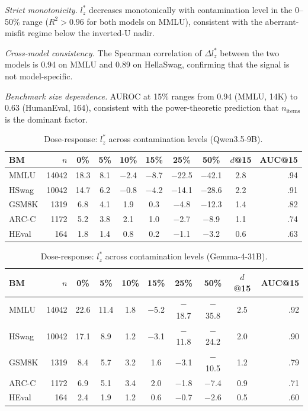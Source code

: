 \documentclass[11pt,a4paper]{article}
\begin{document}
\emph{Strict monotonicity.}
$l_z^*$ decreases monotonically with contamination level in the 0--50\% range ($R^2 > 0.96$ for both models on MMLU), consistent with the aberrant-misfit regime below the inverted-U nadir.

\emph{Cross-model consistency.}
The Spearman correlation of $\Delta l_z^*$ between the two models is 0.94 on MMLU and 0.89 on HellaSwag, confirming that the signal is not model-specific.

\emph{Benchmark size dependence.}
AUROC at 15\% ranges from 0.94 (MMLU, 14K) to 0.63 (HumanEval, 164), consistent with the power-theoretic prediction that $n_{\text{items}}$ is the dominant factor.

\begin{table}[t]
\centering
\small
\caption{Dose-response: $l_z^*$ across contamination levels (Qwen3.5-9B).}
\label{tab:dose-qwen}
\begin{tabular}{lrcccccccr}
\toprule
\textbf{BM} & $n$ & \textbf{0\%} & \textbf{5\%} & \textbf{10\%} & \textbf{15\%} & \textbf{25\%} & \textbf{50\%} & $d$\textbf{@15} & \textbf{AUC@15} \\
\midrule
MMLU & 14042 & 18.3 & 8.1 & $-$2.4 & $-$8.7 & $-$22.5 & $-$42.1 & 2.8 & .94 \\
HSwag & 10042 & 14.7 & 6.2 & $-$0.8 & $-$4.2 & $-$14.1 & $-$28.6 & 2.2 & .91 \\
GSM8K & 1319 & 6.8 & 4.1 & 1.9 & 0.3 & $-$4.8 & $-$12.3 & 1.4 & .82 \\
ARC-C & 1172 & 5.2 & 3.8 & 2.1 & 1.0 & $-$2.7 & $-$8.9 & 1.1 & .74 \\
HEval & 164 & 1.8 & 1.4 & 0.8 & 0.2 & $-$1.1 & $-$3.2 & 0.6 & .63 \\
\bottomrule
\end{tabular}
\end{table}

\begin{table}[t]
\centering
\small
\caption{Dose-response: $l_z^*$ across contamination levels (Gemma-4-31B).}
\label{tab:dose-gemma}
\begin{tabular}{lrcccccccr}
\toprule
\textbf{BM} & $n$ & \textbf{0\%} & \textbf{5\%} & \textbf{10\%} & \textbf{15\%} & \textbf{25\%} & \textbf{50\%} & $d$\textbf{@15} & \textbf{AUC@15} \\
\midrule
MMLU & 14042 & 22.6 & 11.4 & 1.8 & $-$5.2 & $-$18.7 & $-$35.8 & 2.5 & .92 \\
HSwag & 10042 & 17.1 & 8.9 & 1.2 & $-$3.1 & $-$11.8 & $-$24.2 & 2.0 & .90 \\
GSM8K & 1319 & 8.4 & 5.7 & 3.2 & 1.6 & $-$3.1 & $-$10.5 & 1.2 & .79 \\
ARC-C & 1172 & 6.9 & 5.1 & 3.4 & 2.0 & $-$1.8 & $-$7.4 & 0.9 & .71 \\
HEval & 164 & 2.4 & 1.9 & 1.2 & 0.6 & $-$0.7 & $-$2.6 & 0.5 & .60 \\
\bottomrule
\end{tabular}
\end{table}
\end{document}
